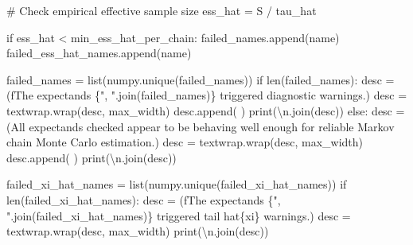 \documentclass[
  letterpaper,
  DIV=11,
  numbers=noendperiod]{scrartcl}
\newenvironment{Shaded}{\begin{snugshade}}{\end{snugshade}}
\newcommand{\BuiltInTok}[1]{\textcolor[rgb]{0.00,0.23,0.31}{#1}}
\newcommand{\CharTok}[1]{\textcolor[rgb]{0.13,0.47,0.30}{#1}}
\newcommand{\CommentTok}[1]{\textcolor[rgb]{0.37,0.37,0.37}{#1}}
\newcommand{\ControlFlowTok}[1]{\textcolor[rgb]{0.00,0.23,0.31}{#1}}
\newcommand{\NormalTok}[1]{\textcolor[rgb]{0.00,0.23,0.31}{#1}}
\newcommand{\OperatorTok}[1]{\textcolor[rgb]{0.37,0.37,0.37}{#1}}
\newcommand{\SpecialCharTok}[1]{\textcolor[rgb]{0.37,0.37,0.37}{#1}}
\newcommand{\SpecialStringTok}[1]{\textcolor[rgb]{0.13,0.47,0.30}{#1}}
\newcommand{\StringTok}[1]{\textcolor[rgb]{0.13,0.47,0.30}{#1}}
\begin{document}
\begin{Shaded}
\begin{Highlighting}[]
      \CommentTok{\# Check empirical effective sample size}
\NormalTok{      ess\_hat }\OperatorTok{=}\NormalTok{ S }\OperatorTok{/}\NormalTok{ tau\_hat}

      \ControlFlowTok{if}\NormalTok{ ess\_hat }\OperatorTok{\textless{}}\NormalTok{ min\_ess\_hat\_per\_chain:}
\NormalTok{        failed\_names.append(name)}
\NormalTok{        failed\_ess\_hat\_names.append(name)}

\NormalTok{  failed\_names }\OperatorTok{=} \BuiltInTok{list}\NormalTok{(numpy.unique(failed\_names))}
  \ControlFlowTok{if} \BuiltInTok{len}\NormalTok{(failed\_names):}
\NormalTok{    desc }\OperatorTok{=}\NormalTok{ (}\SpecialStringTok{f\textquotesingle{}The expectands }\SpecialCharTok{\{}\StringTok{", "}\SpecialCharTok{.}\NormalTok{join(failed\_names)}\SpecialCharTok{\}}\SpecialStringTok{ \textquotesingle{}}
             \StringTok{\textquotesingle{}triggered diagnostic warnings.\textquotesingle{}}\NormalTok{)}
\NormalTok{    desc }\OperatorTok{=}\NormalTok{ textwrap.wrap(desc, max\_width)}
\NormalTok{    desc.append(}\StringTok{\textquotesingle{} \textquotesingle{}}\NormalTok{)}
    \BuiltInTok{print}\NormalTok{(}\StringTok{\textquotesingle{}}\CharTok{\textbackslash{}n}\StringTok{\textquotesingle{}}\NormalTok{.join(desc))}
  \ControlFlowTok{else}\NormalTok{:}
\NormalTok{    desc }\OperatorTok{=}\NormalTok{ (}\StringTok{\textquotesingle{}All expectands checked appear to be behaving well enough \textquotesingle{}}
            \StringTok{\textquotesingle{}for reliable Markov chain Monte Carlo estimation.\textquotesingle{}}\NormalTok{)}
\NormalTok{    desc }\OperatorTok{=}\NormalTok{ textwrap.wrap(desc, max\_width)}
\NormalTok{    desc.append(}\StringTok{\textquotesingle{} \textquotesingle{}}\NormalTok{)}
    \BuiltInTok{print}\NormalTok{(}\StringTok{\textquotesingle{}}\CharTok{\textbackslash{}n}\StringTok{\textquotesingle{}}\NormalTok{.join(desc))}

\NormalTok{  failed\_xi\_hat\_names }\OperatorTok{=} \BuiltInTok{list}\NormalTok{(numpy.unique(failed\_xi\_hat\_names))}
  \ControlFlowTok{if} \BuiltInTok{len}\NormalTok{(failed\_xi\_hat\_names):}
\NormalTok{    desc }\OperatorTok{=}\NormalTok{ (}\SpecialStringTok{f\textquotesingle{}The expectands }\SpecialCharTok{\{}\StringTok{", "}\SpecialCharTok{.}\NormalTok{join(failed\_xi\_hat\_names)}\SpecialCharTok{\}}\SpecialStringTok{ \textquotesingle{}}
             \StringTok{\textquotesingle{}triggered tail hat}\SpecialCharTok{\{xi\}}\StringTok{ warnings.\textquotesingle{}}\NormalTok{)}
\NormalTok{    desc }\OperatorTok{=}\NormalTok{ textwrap.wrap(desc, max\_width)}
    \BuiltInTok{print}\NormalTok{(}\StringTok{\textquotesingle{}}\CharTok{\textbackslash{}n}\StringTok{\textquotesingle{}}\NormalTok{.join(desc))}


\end{Highlighting}
\end{Shaded}
\end{document}
